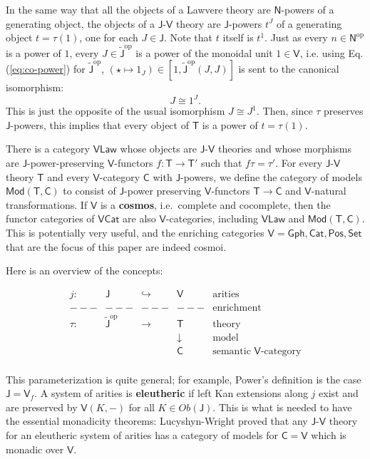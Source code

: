 \documentclass{amsart}
\theoremstyle{definition}
\newcommand{\Gph}{\mathsf{Gph}}
\newcommand{\Set}{\mathsf{Set}}
\newcommand{\Cat}{\mathsf{Cat}}
\newcommand{\Law}{\mathsf{Law}}
\newcommand{\Pos}{\mathsf{Pos}}
\newcommand{\Mod}{\mathsf{Mod}}
\newcommand{\NN}{\mathsf{N}}
\newcommand{\V}{\mathsf{V}}
\newcommand{\C}{\mathsf{C}}
\newcommand{\J}{\mathsf{J}}
\newcommand{\T}{\mathsf{T}}
\newcommand{\op}{\mathrm{op}}
\newcommand{\maps}{\colon}
\begin{document}
In the same way that all the objects of a Lawvere theory are $\NN$-powers of a generating object, the objects of a $\J$-$\V$ theory are $\J$-powers $t^J$ of a generating object $t = \tau(1)$, one for each $J \in \J$. Note that $t$ itself is $t^1$.  Just as every $n\in \NN^\op$ is a power of $1$, every $J\in \tilde{\J}^{\op}$ is a power of the monoidal unit $1\in \V$, i.e. using Eq. (\ref{eq:co-power}) for $\tilde{\J}^{\op}$, $(\star \mapsto 1_J) \in [1,\tilde{\J}^{\op}(J,J)]$ is sent to the canonical isomorphism:
\begin{equation}
J \cong 1^J.
\end{equation}
This is just the opposite of the usual isomorphism $J \cong J^1$. Then, since $\tau$ preserves $\J$-powers, this implies that every object of $\T$ is a power of $t = \tau(1)$.

There is a category $\V\Law$ whose objects are $\J$-$\V$ theories and whose morphisms are $\J$-power-preserving $\V$-functors $f\maps \T \to \T'$ such that $f\tau = \tau'$. For every $\J$-$\V$ theory $\T$ and every $\V$-category $\C$ with $\J$-powers, we define the category of models $\Mod(\T,\C)$ to consist of $\J$-power preserving $\V$-functors $\T\to \C$ and $\V$-natural transformations. If  $\V$ is a \textbf{cosmos}, i.e.\ complete and cocomplete, then the functor categories of $\V\Cat$ are also $\V$-categories, including $\V\Law$ and $\Mod(\T,\C)$. This is potentially very useful, and the enriching categories $\V = \Gph, \Cat, \Pos, \Set$ that are the focus of this paper are indeed cosmoi.

Here is an overview of the concepts: 

\[\begin{array}{ccccl}
j\maps & \J & \hookrightarrow & \V & \text{arities}\\
---& --- & --- & --- & \text{enrichment}\\
\tau\maps & \tilde{\J}^\op & \to & \T & \text{theory}\\
& & & \downarrow & \text{model}\\
& & & \C & \text{semantic $\V$-category}\\
\end{array}\]

This parameterization is quite general; for example, Power's definition is the case $\J = \V_f$. A system of arities is \textbf{eleutheric} if left Kan extensions along $j$ exist and are preserved by $\V(K,-)$ for all $K \in Ob(\J)$. This is what is needed to have the essential monadicity theorems: Lucyshyn-Wright proved that any $\J$-$\V$ theory for an eleutheric system of arities has a category of models for $\C = \V$ which is monadic over $\V$. 
\end{document}
